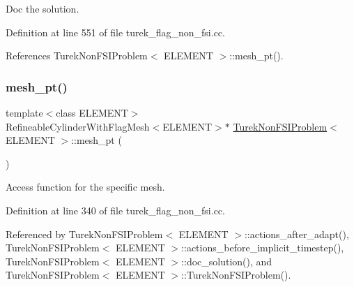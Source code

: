 Doc the solution. 



Definition at line 551 of file turek\+\_\+flag\+\_\+non\+\_\+fsi.\+cc.



References Turek\+Non\+F\+S\+I\+Problem$<$ E\+L\+E\+M\+E\+N\+T $>$\+::mesh\+\_\+pt().

\mbox{\label{classTurekNonFSIProblem_a6b9af904a3091d55a61b35c2ce7d7fcb}} 
\subsubsection{\texorpdfstring{mesh\+\_\+pt()}{mesh\_pt()}\hspace{0.1cm}{\footnotesize\ttfamily [1/2]}}
{\footnotesize\ttfamily template$<$class E\+L\+E\+M\+E\+NT$>$ \\
Refineable\+Cylinder\+With\+Flag\+Mesh$<$E\+L\+E\+M\+E\+NT$>$$\ast$ \hyperlink{classTurekNonFSIProblem}{Turek\+Non\+F\+S\+I\+Problem}$<$ E\+L\+E\+M\+E\+NT $>$\+::mesh\+\_\+pt (\begin{DoxyParamCaption}{ }\end{DoxyParamCaption})\hspace{0.3cm}{\ttfamily [inline]}}



Access function for the specific mesh. 



Definition at line 340 of file turek\+\_\+flag\+\_\+non\+\_\+fsi.\+cc.



Referenced by Turek\+Non\+F\+S\+I\+Problem$<$ E\+L\+E\+M\+E\+N\+T $>$\+::actions\+\_\+after\+\_\+adapt(), Turek\+Non\+F\+S\+I\+Problem$<$ E\+L\+E\+M\+E\+N\+T $>$\+::actions\+\_\+before\+\_\+implicit\+\_\+timestep(), Turek\+Non\+F\+S\+I\+Problem$<$ E\+L\+E\+M\+E\+N\+T $>$\+::doc\+\_\+solution(), and Turek\+Non\+F\+S\+I\+Problem$<$ E\+L\+E\+M\+E\+N\+T $>$\+::\+Turek\+Non\+F\+S\+I\+Problem().

\mbox{\label{classTurekNonFSIProblem_a46da5ab0ac3d390eba02f7a4eb2795d5}} 
